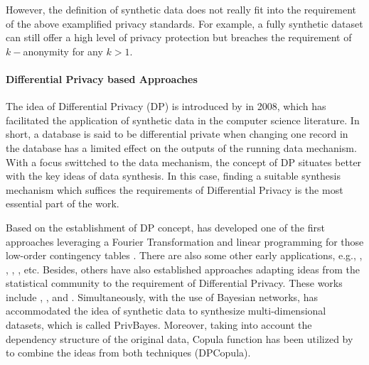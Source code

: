 However, the definition of synthetic data does not really fit into the requirement of the above examplified privacy standards. For example, a fully
synthetic dataset can still offer a high level of privacy protection but breaches the requirement of $k-$anonymity for any $k>1$.

\paragraph{Differential Privacy based Approaches}
The idea of Differential Privacy (DP) is introduced by \citet{dwork2008differential} in 2008, which has facilitated the application of
synthetic data in the computer science literature. In short, a database is said to be differential private when changing one
record in the database has a limited effect on the outputs of the running data mechanism. With a focus swittched to the data mechanism, 
the concept of DP situates better with the key ideas of data synthesis. In this case, finding a suitable synthesis mechanism which suffices
the requirements of Differential Privacy is the most essential part of the work. 


Based on the establishment of DP concept, \citet{barak2007privacy} has developed one of the first approaches leveraging a Fourier Transformation
and linear programming for those low-order contingency tables \citep{dwork2008differential}. There are also some other early applications, e.g., \citep{eno2008generating},
\citep{cano2010evaluation}, \citep{blum2013learning}, \citep{xiao2010differential}, etc. Besides, others have also established approaches adapting
ideas from the statistical community to the requirement of Differential Privacy. These works include \citep{abowd2008protective}, 
\citep{machanavajjhala2008privacy}, \citep{charest2011can} and \citep{mcclure2012differential}. Simultaneously, with the use of Bayesian networks, 
\citep{zhang2017privbayes} has accommodated the idea of synthetic data to synthesize multi-dimensional datasets, which is called PrivBayes. Moreover,
taking into account the dependency structure of the original data, Copula function has been utilized by \citet{li2014differentially} to combine the ideas from both techniques (DPCopula).

